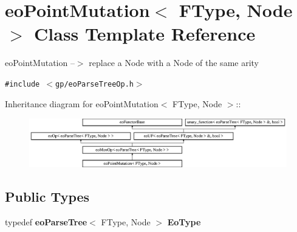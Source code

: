 \section{eo\-Point\-Mutation$<$ FType, Node $>$ Class Template Reference}
\label{classeo_point_mutation}
eo\-Point\-Mutation --$>$ replace a Node with a Node of the same arity  


{\tt \#include $<$gp/eo\-Parse\-Tree\-Op.h$>$}

Inheritance diagram for eo\-Point\-Mutation$<$ FType, Node $>$::\begin{figure}[H]
\begin{center}
\leavevmode
\includegraphics[height=2.14559cm]{classeo_point_mutation}
\end{center}
\end{figure}
\subsection*{Public Types}
\begin{CompactItemize}
\item 
typedef {\bf eo\-Parse\-Tree}$<$ FType, Node $>$ {\bf Eo\-Type}\label{classeo_point_mutation_w0}

\end{CompactItemize}
